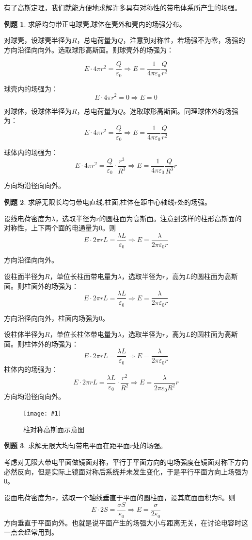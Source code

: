\documentclass[12pt,a4paper,oneside]{report}
\theoremstyle{definition}
\newtheorem{example}{例题}[chapter]
\theoremstyle{remark}
\newcommand{\insertfig}[3]{
    \begin{figure}[ht]
        \centering
        \texttt{[image: \#1]}
        \caption{#2}
        \label{fig:#1}
    \end{figure}
}
\begin{document}
有了高斯定理，我们就能方便地求解许多具有对称性的带电体系所产生的场强。
\begin{example}
  求解均匀带正电球壳,球体在壳外和壳内的场强分布。

  对球壳，设球壳半径为$R$，总电荷量为$Q$，注意到对称性，若场强不为零，场强的方向沿径向向外。选取球形高斯面。则球壳外的场强为：

  \[
  E \cdot 4\pi r^2 = \frac{Q}{\varepsilon_0} \Rightarrow E = \frac{1}{4\pi\varepsilon_0} \frac{Q}{r^2}
  \]

  球壳内的场强为：
  \[
  E \cdot 4\pi r^2 = 0 \Rightarrow E = 0
  \]

  对球体，设球体半径为$R$，总电荷量为$Q$。选取球形高斯面。同理球体外的场强为：
  \[
  E \cdot 4\pi r^2 = \frac{Q}{\varepsilon_0} \Rightarrow E = \frac{1}{4\pi\varepsilon_0} \frac{Q}{r^2}
  \]

  球体内的场强为：
  \[
  E \cdot 4\pi r^2 = \frac{Q}{\varepsilon_0} \cdot \frac{r^3}{R^3} \Rightarrow E = \frac{1}{4\pi\varepsilon_0} \frac{Q}{R^3} r
  \]

  方向均沿径向向外。
\end{example}

\begin{example}
  求解无限长均匀带电直线,柱面,柱体在距中心轴线$r$处的场强。

  设线电荷密度为$\lambda$，选取半径为$r$的圆柱面为高斯面。注意到这样的柱形高斯面的对称性，上下两个面的电通量为0。则
  \[
  E \cdot 2\pi r L = \frac{\lambda L}{\varepsilon_0} \Rightarrow E = \frac{\lambda}{2\pi\varepsilon_0 r}
  \]

  方向沿径向向外。

  设柱面半径为$R$，单位长柱面带电量为$\lambda$，选取半径为$r$，高为$L$的圆柱面为高斯面。则柱面外的场强为：
  \[
  E \cdot 2\pi r L = \frac{\lambda L}{\varepsilon_0} \Rightarrow E = \frac{\lambda}{2\pi\varepsilon_0 r}
  \]
  
  方向沿径向向外，柱面内场强为0。

  设柱体半径为$R$，单位长柱体带电量为$\lambda$，选取半径为$r$，高为$L$的圆柱面为高斯面。则柱体外的场强为：
  \[
  E \cdot 2\pi r L = \frac{\lambda L}{\varepsilon_0} \Rightarrow E = \frac{\lambda}{2\pi\varepsilon_0 r}
  \]
  柱体内的场强为：
  \[
  E \cdot 2\pi r L = \frac{\lambda L}{\varepsilon_0} \cdot \frac{r^2}{R^2} \Rightarrow E = \frac{\lambda}{2\pi\varepsilon_0 R^2} r
  \]
  方向均沿径向向外。
\end{example}
\insertfig{1-1.png}{柱对称高斯面示意图}{0.25}

\begin{example}
  求解无限大均匀带电平面在距平面$r$处的场强。

  考虑对无限大带电平面做镜面对称，平行于平面方向的电场强度在镜面对称下方向必然反向，但是实际上镜面对称后系统并未发生变化，于是平行平面方向上场强为0。

  设面电荷密度为$\sigma$，选取一个轴线垂直于平面的圆柱面，设其底面面积为S。则
  \[
  E \cdot 2S = \frac{\sigma S}{\varepsilon_0} \Rightarrow E = \frac{\sigma}{2\varepsilon_0}
  \]
  方向垂直于平面向外。也就是说平面产生的场强大小与距离无关，在讨论电容时这一点会经常用到。
\end{example}
\end{document}
